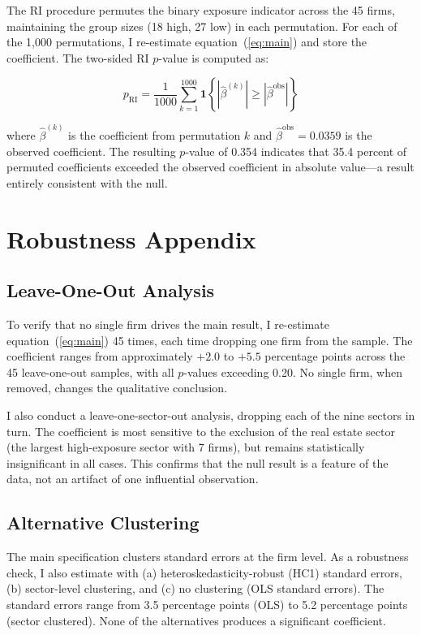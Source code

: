 \documentclass[12pt]{article}
\begin{document}
The RI procedure permutes the binary exposure indicator across the 45 firms, maintaining the group sizes (18 high, 27 low) in each permutation. For each of the 1,000 permutations, I re-estimate equation~(\ref{eq:main}) and store the coefficient. The two-sided RI $p$-value is computed as:

\begin{equation}
    p_{\text{RI}} = \frac{1}{1000} \sum_{k=1}^{1000} \mathbf{1}\left\{|\hat{\beta}^{(k)}| \geq |\hat{\beta}^{\text{obs}}|\right\}
\end{equation}

\noindent where $\hat{\beta}^{(k)}$ is the coefficient from permutation $k$ and $\hat{\beta}^{\text{obs}} = 0.0359$ is the observed coefficient. The resulting $p$-value of 0.354 indicates that 35.4 percent of permuted coefficients exceeded the observed coefficient in absolute value---a result entirely consistent with the null.


\section{Robustness Appendix}\label{app:robustness}

\subsection{Leave-One-Out Analysis}

To verify that no single firm drives the main result, I re-estimate equation~(\ref{eq:main}) 45 times, each time dropping one firm from the sample. The coefficient ranges from approximately $+2.0$ to $+5.5$ percentage points across the 45 leave-one-out samples, with all $p$-values exceeding 0.20. No single firm, when removed, changes the qualitative conclusion.

I also conduct a leave-one-sector-out analysis, dropping each of the nine sectors in turn. The coefficient is most sensitive to the exclusion of the real estate sector (the largest high-exposure sector with 7 firms), but remains statistically insignificant in all cases. This confirms that the null result is a feature of the data, not an artifact of one influential observation.

\subsection{Alternative Clustering}

The main specification clusters standard errors at the firm level. As a robustness check, I also estimate with (a) heteroskedasticity-robust (HC1) standard errors, (b) sector-level clustering, and (c) no clustering (OLS standard errors). The standard errors range from 3.5 percentage points (OLS) to 5.2 percentage points (sector clustered). None of the alternatives produces a significant coefficient.
\end{document}
